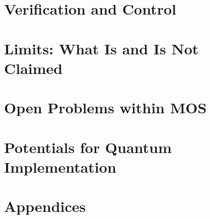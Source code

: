 \documentclass[11pt,openany]{book}
\begin{document}
\part{Verification and Control}


\part{Limits: What Is and Is Not Claimed}


\part{Open Problems within MOS}


\part{Potentials for Quantum Implementation}


\appendix
\part*{Appendices}




\backmatter


\end{document}

